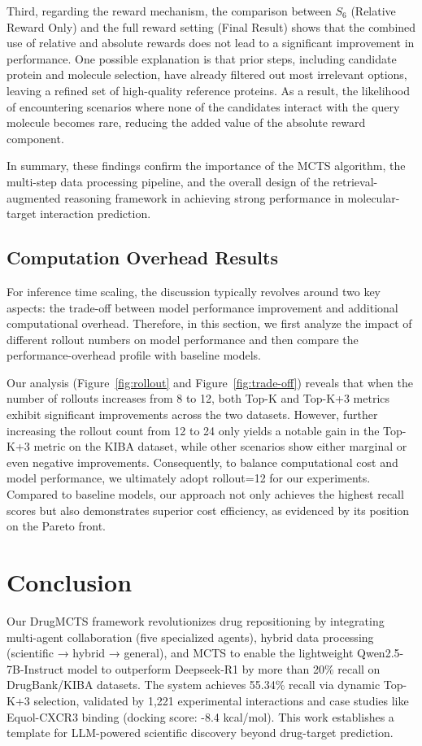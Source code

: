 \documentclass[letterpaper,twocolumn,10pt]{llncs}
\begin{document}
Third, regarding the reward mechanism, the comparison between $S_6$ (Relative Reward Only) and the full reward setting (Final Result) shows that the combined use of relative and absolute rewards does not lead to a significant improvement in performance. One possible explanation is that prior steps, including candidate protein and molecule selection, have already filtered out most irrelevant options, leaving a refined set of high-quality reference proteins. As a result, the likelihood of encountering scenarios where none of the candidates interact with the query molecule becomes rare, reducing the added value of the absolute reward component.

In summary, these findings confirm the importance of the MCTS algorithm, the multi-step data processing pipeline, and the overall design of the retrieval-augmented reasoning framework in achieving strong performance in molecular-target interaction prediction.



\subsection{Computation Overhead Results}
For inference time scaling, the discussion typically revolves around two key aspects: the trade-off between model performance improvement and additional computational overhead. Therefore, in this section, we first analyze the impact of different rollout numbers on model performance and then compare the performance-overhead profile with baseline models.

Our analysis (Figure~\ref{fig:rollout} and Figure~\ref{fig:trade-off}) reveals that when the number of rollouts increases from 8 to 12, both Top-K and Top-K+3 metrics exhibit significant improvements across the two datasets. However, further increasing the rollout count from 12 to 24 only yields a notable gain in the Top-K+3 metric on the KIBA dataset, while other scenarios show either marginal or even negative improvements. Consequently, to balance computational cost and model performance, we ultimately adopt rollout=12 for our experiments. Compared to baseline models, our approach not only achieves the highest recall scores but also demonstrates superior cost efficiency, as evidenced by its position on the Pareto front.

\section{Conclusion}
Our DrugMCTS framework revolutionizes drug repositioning by integrating multi-agent collaboration (five specialized agents), hybrid data processing (scientific → hybrid → general), and MCTS to enable the lightweight Qwen2.5-7B-Instruct model to outperform Deepseek-R1 by more than 20\% recall on DrugBank/KIBA datasets. The system achieves 55.34\% recall via dynamic Top-K+3 selection, validated by 1,221 experimental interactions and case studies like Equol-CXCR3 binding (docking score: -8.4 kcal/mol). This work establishes a template for LLM-powered scientific discovery beyond drug-target prediction.
\end{document}
